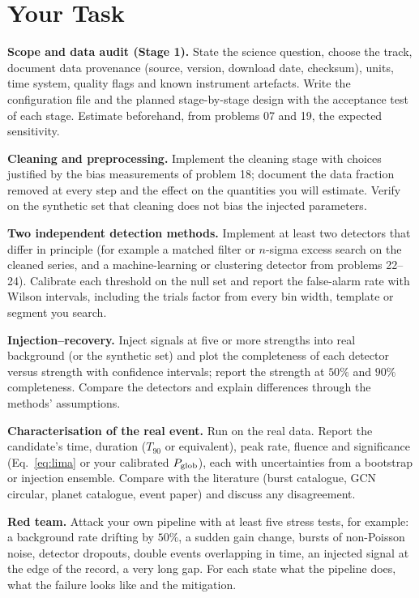 \documentclass[11pt,a4paper]{article}
\begin{document}
\section*{Your Task}
\begin{tasks}
  \item \textbf{Scope and data audit (Stage 1).} State the science question, choose the track, document data provenance (source, version, download date, checksum), units, time system, quality flags and known instrument artefacts. Write the configuration file and the planned stage-by-stage design with the acceptance test of each stage. Estimate beforehand, from problems 07 and 19, the expected sensitivity.
  \item \textbf{Cleaning and preprocessing.} Implement the cleaning stage with choices justified by the bias measurements of problem 18; document the data fraction removed at every step and the effect on the quantities you will estimate. Verify on the synthetic set that cleaning does not bias the injected parameters.
  \item \textbf{Two independent detection methods.} Implement at least two detectors that differ in principle (for example a matched filter or $n$-sigma excess search on the cleaned series, and a machine-learning or clustering detector from problems 22--24). Calibrate each threshold on the null set and report the false-alarm rate with Wilson intervals, including the trials factor from every bin width, template or segment you search.
  \item \textbf{Injection--recovery.} Inject signals at five or more strengths into real background (or the synthetic set) and plot the completeness of each detector versus strength with confidence intervals; report the strength at $50\%$ and $90\%$ completeness. Compare the detectors and explain differences through the methods' assumptions.
  \item \textbf{Characterisation of the real event.} Run on the real data. Report the candidate's time, duration ($T_{90}$ or equivalent), peak rate, fluence and significance (Eq.~\eqref{eq:lima} or your calibrated $P_{\rm glob}$), each with uncertainties from a bootstrap or injection ensemble. Compare with the literature (burst catalogue, GCN circular, planet catalogue, event paper) and discuss any disagreement.
  \item \textbf{Red team.} Attack your own pipeline with at least five stress tests, for example: a background rate drifting by $50\%$, a sudden gain change, bursts of non-Poisson noise, detector dropouts, double events overlapping in time, an injected signal at the edge of the record, a very long gap. For each state what the pipeline does, what the failure looks like and the mitigation.

\end{tasks}
\end{document}
